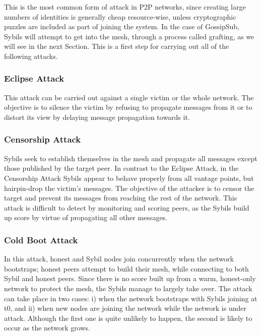 \documentclass{article}
\begin{document}
This is the most common form of attack in
P2P networks, since creating large numbers of identities is
generally cheap resource-wise, unless cryptographic puzzles
are included as part of joining the system. In the case of
GossipSub, Sybils will attempt to get into the mesh, through
a process called grafting, as we will see in the next Section.
This is a first step for carrying out all of the following attacks.

\subsubsection{Eclipse Attack}

This attack can be carried out against
a single victim or the whole network. The objective is to
silence the victim by refusing to propagate messages from
it or to distort its view by delaying message propagation
towards it.

\subsubsection{Censorship Attack}

Sybils seek to establish themselves
in the mesh and propagate all messages except those published by the target peer. In contrast to the Eclipse Attack,
in the Censorship Attack Sybils appear to behave properly
from all vantage points, but hairpin-drop the victim’s messages. The objective of the attacker is to censor the target and
prevent its messages from reaching the rest of the network.
This attack is difficult to detect by monitoring and scoring
peers, as the Sybils build up score by virtue of propagating
all other messages.

\subsubsection{Cold Boot Attack}

In this attack, honest and Sybil nodes
join concurrently when the network bootstraps; honest peers
attempt to build their mesh, while connecting to both Sybil
and honest peers. Since there is no score built up from a
warm, honest-only network to protect the mesh, the Sybils
manage to largely take over.
The attack can take place in two cases: i) when the network
bootstraps with Sybils joining at t0, and ii) when new nodes
are joining the network while the network is under attack.
Although the first one is quite unlikely to happen, the second
is likely to occur as the network grows.
\end{document}
